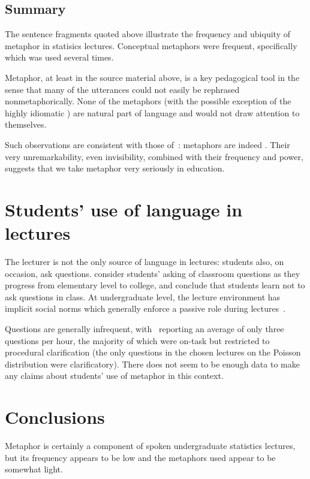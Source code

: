 \subsection{Summary}

The sentence fragments quoted above illustrate the frequency and
ubiquity of metaphor in statisics lectures.  Conceptual metaphors were
frequent, specifically  which was used
several times.

Metaphor, at least in the source material above, is a key pedagogical
tool in the sense that many of the utterances could not easily be
rephrased nonmetaphorically.  None of the metaphors (with the possible
exception of the highly idiomatic ) are
natural part of language and would not draw attention to themselves.

Such observations are consistent with those of~:
metaphors are indeed .  Their very
unremarkability, even invisibility, combined with their frequency and
power, suggests that we take metaphor very seriously in education.

\section{Students' use of language in lectures}

The lecturer is not the only source of language in lectures: students
also, on occasion, ask questions.   consider
students' asking of classroom questions as they progress from
elementary level to college, and conclude that students learn not to
ask questions in class.  At undergraduate level, the lecture
environment has implicit social norms which generally enforce a
passive role during lectures~\citep{yoon2011}.

Questions are generally infrequent, with~
reporting an average of only three questions per hour, the majority of
which were on-task but restricted to procedural clarification (the
only questions in the chosen lectures on the Poisson distribution were
clarificatory).  There does not seem to be enough data to make any
claims about students' use of metaphor in this context.

\section{Conclusions}


Metaphor is certainly a component of spoken undergraduate statistics
lectures, but its frequency appears to be low and the metaphors used
appear to be somewhat light.

